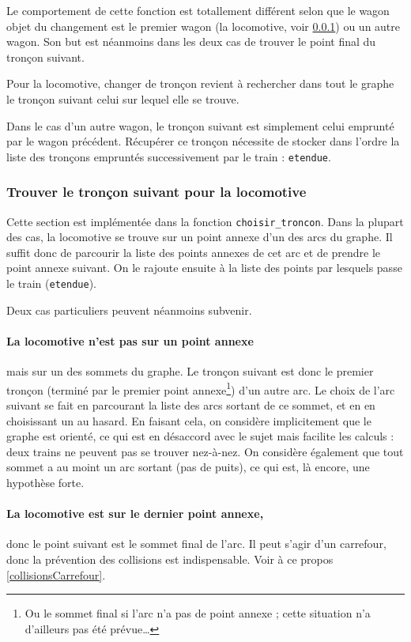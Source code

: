 \documentclass[a4paper, oneside, 11pt, twocolumn]{article}
\begin{document}
Le comportement de cette fonction est totallement différent selon que le wagon objet du changement est le premier wagon (la locomotive, voir \ref{choisirTroncon}) ou un autre wagon. Son but est néanmoins dans les deux cas de trouver le point final du tronçon suivant.

Pour la locomotive, changer de tronçon revient à rechercher dans tout le graphe le tronçon suivant celui sur lequel elle se trouve.

Dans le cas d'un autre wagon, le tronçon suivant est simplement celui emprunté par le wagon précédent. Récupérer ce tronçon nécessite de stocker dans l'ordre la liste des tronçons empruntés successivement par le train : \texttt{etendue}.

\subsubsection[Choisir un tronçon]{Trouver le tronçon suivant pour la locomotive}
\label{choisirTroncon}

Cette section est implémentée dans la fonction \texttt{choisir\_troncon}. Dans la plupart des cas, la locomotive se trouve sur un point annexe d'un des arcs du graphe. Il suffit donc de parcourir la liste des points annexes de cet arc et de prendre le point annexe suivant. On le rajoute ensuite à la liste des points par lesquels passe le train (\texttt{etendue}).

Deux cas particuliers peuvent néanmoins subvenir.

\paragraph{La locomotive n'est pas sur un point annexe} mais sur un des sommets du graphe. Le tronçon suivant est donc le premier tronçon (terminé par le premier point annexe\footnote{Ou le sommet final si l'arc n'a pas de point annexe ; cette situation n'a d'ailleurs pas été prévue\dots}) d'un autre arc. Le choix de l'arc suivant se fait en parcourant la liste des arcs sortant de ce sommet, et en en choisissant un au hasard. En faisant cela, on considère implicitement que le graphe est orienté, ce qui est en désaccord avec le sujet mais facilite les calculs : deux trains ne peuvent pas se trouver nez-à-nez. On considère également que tout sommet a au moint un arc sortant (pas de puits), ce qui est, là encore, une hypothèse forte.

\paragraph{La locomotive est sur le dernier point annexe,} donc le point suivant est le sommet final de l'arc. Il peut s'agir d'un carrefour, donc la prévention des collisions est indispensable. Voir à ce propos \ref{collisionsCarrefour}.
\end{document}
